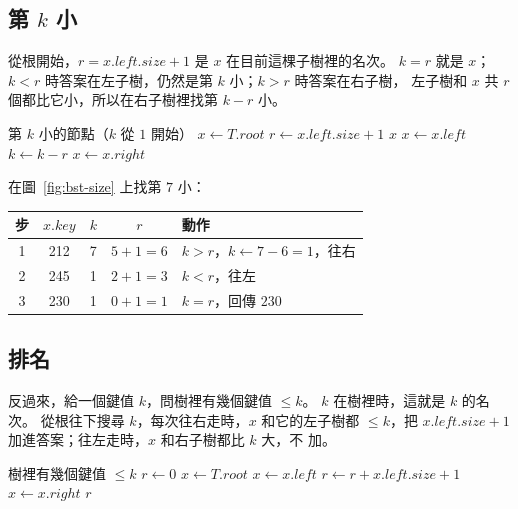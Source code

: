 \subsection{第 $k$ 小}

從根開始，$r = x.\mathit{left}.\mathit{size} + 1$ 是 $x$ 在目前這棵子樹裡的名次。
$k = r$ 就是 $x$；$k < r$ 時答案在左子樹，仍然是第 $k$ 小；$k > r$ 時答案在右子樹，
左子樹和 $x$ 共 $r$ 個都比它小，所以在右子樹裡找第 $k - r$ 小。

\begin{pseudo}[label=alg:bst-select]{第 $k$ 小的節點（$k$ 從 $1$ 開始）}
    \State $x \gets T.\mathit{root}$
        \State $r \gets x.\mathit{left}.\mathit{size} + 1$ 
            \State \Return $x$
            \State $x \gets x.\mathit{left}$
        \Else
            \State $k \gets k - r$
            \State $x \gets x.\mathit{right}$
        \EndIf
    \EndWhile
    \State \Return \NIL {}
\EndFunction
\end{pseudo}

在圖~\ref{fig:bst-size} 上找第 $7$ 小：

\begin{center}
\begin{tabular}{ccccl}
\toprule
步 & $x.\mathit{key}$ & $k$ & $r$ & 動作 \\
\midrule
1 & 212 & 7 & $5 + 1 = 6$ & $k > r$，$k \gets 7 - 6 = 1$，往右 \\
2 & 245 & 1 & $2 + 1 = 3$ & $k < r$，往左 \\
3 & 230 & 1 & $0 + 1 = 1$ & $k = r$，回傳 $230$ \\
\bottomrule
\end{tabular}
\end{center}

\subsection{排名}

反過來，給一個鍵值 $k$，問樹裡有幾個鍵值 $\le k$。 $k$ 在樹裡時，這就是 $k$ 的名
次。 從根往下搜尋 $k$，每次往右走時，$x$ 和它的左子樹都 $\le k$，把
$x.\mathit{left}.\mathit{size} + 1$ 加進答案；往左走時，$x$ 和右子樹都比 $k$ 大，不
加。

\begin{pseudo}[label=alg:bst-rank]{樹裡有幾個鍵值 $\le k$}
    \State $r \gets 0$
    \State $x \gets T.\mathit{root}$
            \State $x \gets x.\mathit{left}$
        \Else {}
            \State $r \gets r + x.\mathit{left}.\mathit{size} + 1$
            \State $x \gets x.\mathit{right}$
        \EndIf
    \EndWhile
    \State \Return $r$
\EndFunction
\end{pseudo}

